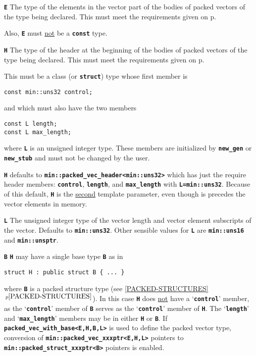 \documentclass[12pt]{article}
\newcommand{\TT}[1]{{\tt \bfseries #1}}
\newcommand{\itemref}[1]{\ref{#1}$\,^{p\pageref{#1}}$}
\newcommand{\pagref}[1]{p\pageref{#1}}
\newcommand{\EOL}{\penalty \exhyphenpenalty}
\newenvironment{indpar}[1][0.3in]%
	{\begin{list}{}%
		     {\setlength{\itemsep}{0in}%
		      \setlength{\topsep}{0in}%
		      \setlength{\parsep}{1ex}%
		      \setlength{\labelwidth}{#1}%
		      \setlength{\leftmargin}{#1}%
		      \addtolength{\leftmargin}{\labelsep}}%
	 \item}%
	{\end{list}}
\newenvironment{itemlist}[1][1.2in]%
	{\begin{list}{}{\setlength{\labelwidth}{#1}%
		        \setlength{\leftmargin}{\labelwidth}%
		        \addtolength{\leftmargin}{+0.2in}%
		        \renewcommand{\makelabel}[1]{##1\hfill}}}%
	{\end{list}}
\begin{document}
\begin{itemlist}[0.5in]

\item[\TT{E}]\label{PACKED_VEC_ELEMENT_TYPE}
The type of the elements in the vector part of the
bodies of packed vectors of the type being
declared.  This must meet the requirements given on
\pagref{PACKED-VECTOR-TYPE-REQUIREMENTS}.

Also, \TT{E} must \underline{not} be a \TT{const} type.

\item[\TT{H}]\label{PACKED_VEC_HEADER_TYPE}
The type of the header at the beginning of the
bodies of packed vectors of the type being
declared.  This must meet the requirements given on
\pagref{PACKED-VECTOR-TYPE-REQUIREMENTS}.

This must be a class (or \TT{struct}) type
whose first member is
\begin{indpar}
\verb|const min::uns32 control;|
\end{indpar}
and which must also have the two members
\begin{indpar}
\verb|const L length;| \\
\verb|const L max_length;|
\end{indpar}
where \TT{L} is an unsigned integer type.
These members are initialized by \TT{new\_gen} or \TT{new\_stub}
and must not
be changed by the user.

\TT{H} defaults to \TT{min::packed\_vec\_header<min::uns32>} which
has just the require header members: \TT{control}, \TT{length}, and
\TT{max\_\EOL length} with \TT{L=min::uns32}.  Because of this default,
\TT{H} is the \underline{second} template parameter,
even though is precedes the vector elements in memory.

\item[\TT{L}]
The unsigned integer type of the vector length and vector element subscripts
of the vector.  Defaults to \TT{min::\EOL uns32}.
Other sensible values for \TT{L} are
\TT{min::\EOL uns16} and \TT{min::\EOL unsptr}.

\item[\TT{B}]
\TT{H} may have a single base type \TT{B} as in
\begin{indpar}\begin{verbatim}
struct H : public struct B { ... }
\end{verbatim}\end{indpar}
where \TT{B} is a packed structure type (see \itemref{PACKED-STRUCTURES}).
In this case \TT{H} does
\underline{not} have a `\TT{control}' member, as
the `\TT{control}' member of \TT{B} serves as
the `\TT{control}' member of \TT{H}.  The `\TT{length}' and
`\TT{max\_length}' members may be in either \TT{H} or \TT{B}.
If \TT{packed\_\EOL vec\_\EOL with\_\EOL base<E,H,B,L>}
is used to define the packed vector type, conversion of
\TT{min::\EOL packed\_\EOL vec\_\EOL xxxptr<E,H,L>} pointers
to \TT{min::\EOL packed\_\EOL struct\_\EOL xxxptr<B>}
pointers is enabled.

\end{itemlist}
\end{document}
